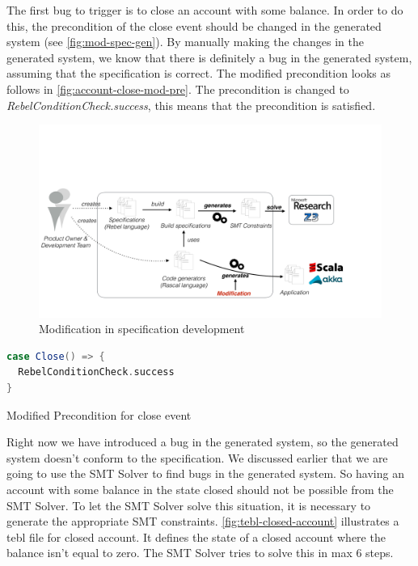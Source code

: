 The first bug to trigger is to close an account with some balance. In order to do this, the precondition of the close event should be changed in the generated system (see \autoref{fig:mod-spec-gen}). By manually making the changes in the generated system, we know that there is definitely a bug in the generated system, assuming that the specification is correct. The modified precondition looks as follows in \autoref{fig:account-close-mod-pre}. The precondition is changed to \textit{RebelConditionCheck.success}, this means that the precondition is satisfied.

\begin{figure}[h!]
  \centering
  \includegraphics[scale=0.26]{figures/mod-generated.pdf}
  \caption{Modification in specification development}
  \label{fig:mod-spec-gen}
\end{figure}

\begin{sourcecode}[h!]
\begin{lstlisting}[language=scala]
case Close() => {
  RebelConditionCheck.success
}
\end{lstlisting}
\caption{Modified Precondition for close event}
\label{fig:account-close-mod-pre}
\end{sourcecode}

Right now we have introduced a bug in the generated system, so the generated system doesn't conform to the specification. We discussed earlier that we are going to use the SMT Solver to find bugs in the generated system. So having an account with some balance in the state closed should not be possible from the SMT Solver. To let the SMT Solver solve this situation, it is necessary to generate the appropriate SMT constraints.  \autoref{fig:tebl-closed-account} illustrates a tebl file for closed account. It defines the state of a closed account where the balance isn't equal to zero. The SMT Solver tries to solve this in max 6 steps. 

